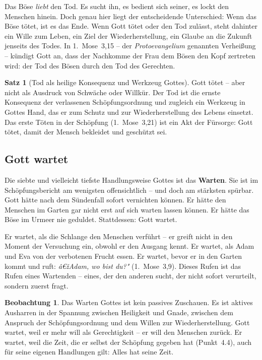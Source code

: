 ﻿\documentclass[a4paper,12pt]{article}
\theoremstyle{definition}
\newtheorem{theorem}{Satz}[section]
\newtheorem{observation}{Beobachtung}[section]
\begin{document}
Das Böse \textit{liebt} den Tod. Es sucht ihn, es bedient sich seiner, es lockt
den Menschen hinein. Doch genau hier liegt der entscheidende Unterschied: Wenn
das Böse tötet, ist es das Ende. Wenn Gott tötet oder den Tod zulässt, steht
dahinter ein Wille zum Leben, ein Ziel der Wiederherstellung, ein Glaube an die
Zukunft jenseits des Todes. In 1.~Mose~3,15 -- der \textit{Protoevangelium}
genannten Verheißung -- kündigt Gott an, dass der Nachkomme der Frau dem Bösen
den Kopf zertreten wird: der Tod des Bösen durch den Tod des Gerechten.

\begin{theorem}[Tod als heilige Konsequenz und Werkzeug Gottes]
	Gott tötet -- aber nicht als Ausdruck von Schwäche oder Willkür. Der Tod ist
	die ernste Konsequenz der verlassenen Schöpfungsordnung und zugleich ein
	Werkzeug in Gottes Hand, das er zum Schutz und zur Wiederherstellung des Lebens
	einsetzt. Das erste Töten in der Schöpfung (1.~Mose~3,21) ist ein Akt der
	Fürsorge: Gott tötet, damit der Mensch bekleidet und geschützt sei.
\end{theorem}

\subsection{Gott wartet}

Die siebte und vielleicht tiefste Handlungsweise Gottes ist das \textbf{Warten}.
Sie ist im Schöpfungsbericht am wenigsten offensichtlich -- und doch am stärksten
spürbar. Gott hätte nach dem Sündenfall sofort vernichten können. Er hätte den
Menschen im Garten gar nicht erst auf sich warten lassen können. Er hätte das Böse
im Urmeer nie geduldet. Stattdessen: Gott wartet.

Er wartet, als die Schlange den Menschen verführt -- er greift nicht in den Moment
der Versuchung ein, obwohl er den Ausgang kennt. Er wartet, als Adam und Eva
von der verbotenen Frucht essen. Er wartet, bevor er in den Garten kommt und ruft:
\textit{â€žAdam, wo bist du?"} (1.~Mose~3,9). Dieses Rufen ist das Rufen eines
Wartenden -- eines, der den anderen sucht, der nicht sofort verurteilt, sondern
zuerst fragt.

\begin{observation}
	Das Warten Gottes ist kein passives Zuschauen. Es ist aktives Ausharren in der
	Spannung zwischen Heiligkeit und Gnade, zwischen dem Anspruch der Schöpfungsordnung
	und dem Willen zur Wiederherstellung. Gott wartet, weil er mehr will als
	Gerechtigkeit -- er will den Menschen zurück. Er wartet, weil die Zeit, die er
	selbst der Schöpfung gegeben hat (Punkt~4.4), auch für seine eigenen Handlungen
	gilt: Alles hat seine Zeit.
\end{observation}
\end{document}
